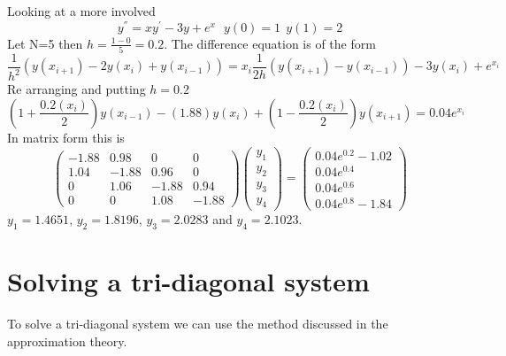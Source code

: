 \begin{example}
Looking at a more involved 
\[y^{''}=xy^{'}-3y+e^x \ \ \ y(0)=1 \ \ y(1)=2 \]
Let N=5 then $h=\frac{1-0}{5}=0.2$. The difference equation is of the form
\[
\frac{1}{h^2}(y(x_{i+1})-2y(x_i)+y(x_{i-1}))=x_i\frac{1}{2h}(y(x_{i+1})-y(x_{i-1}))-3y(x_i)+e^{x_i}\]
Re arranging and putting $h=0.2$
\[(1+\frac{0.2(x_i)}{2})y(x_{i-1})-(1.88)y(x_i)+(1-\frac{0.2(x_i)}{2})y(x_{i+1})=0.04e^{x_i} \]
In matrix form this is
\[\left(\begin{array}{cccc} -1.88&0.98&0&0\\
1.04&-1.88&0.96&0\\
0&1.06&-1.88&0.94\\
0&0&1.08&-1.88
\end{array}\right)
\left(\begin{array}{c} y_1\\
y_2\\
y_3\\
y_4
\end{array}\right)
=
\left(\begin{array}{c}
0.04e^{0.2}-1.02\\
0.04e^{0.4}\\
0.04e^{0.6}\\
0.04e^{0.8}-1.84 
\end{array}\right)
\]
$y_1=1.4651$, $y_2=1.8196$, $y_3=2.0283$ and $y_4=2.1023$.
\end{example}
\section*{Solving a tri-diagonal system}
To solve a tri-diagonal system we can use the method discussed in the approximation theory.

